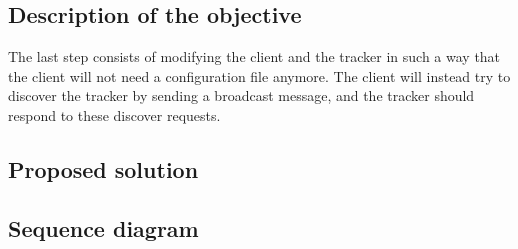 \subsection{Description of the objective}

The last step consists of modifying the client and the tracker in such a way that the client will not need a configuration file anymore. The client will instead try to discover the tracker by sending a broadcast message, and the tracker should respond to these discover requests.

\subsection{Proposed solution}



\subsection{Sequence diagram}
